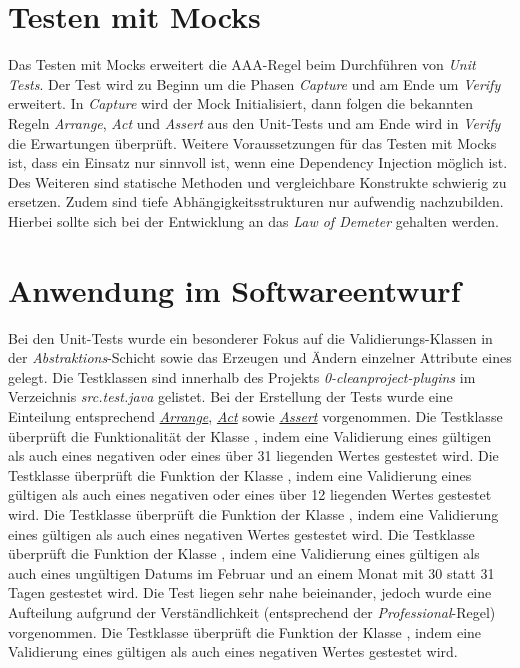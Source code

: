 \section{Testen mit Mocks}
Das Testen mit Mocks erweitert die AAA-Regel beim Durchführen von \textit{Unit Tests}.
Der Test wird zu Beginn um die Phasen \textit{Capture} und am Ende um \textit{Verify} erweitert.
In \textit{Capture} wird der Mock Initialisiert, dann folgen die bekannten Regeln \textit{Arrange}, \textit{Act} und \textit{Assert} aus den Unit-Tests und am Ende wird in \textit{Verify} die Erwartungen überprüft.
Weitere Voraussetzungen für das Testen mit Mocks ist, dass ein Einsatz nur sinnvoll ist, wenn eine Dependency Injection möglich ist.
Des Weiteren sind statische Methoden und vergleichbare Konstrukte schwierig zu ersetzen.
Zudem sind tiefe Abhängigkeitsstrukturen nur aufwendig nachzubilden.
Hierbei sollte sich bei der Entwicklung an das \textit{Law of Demeter} gehalten werden.

\section{Anwendung im Softwareentwurf}
Bei den Unit-Tests wurde ein besonderer Fokus auf die Validierungs-Klassen in der \textit{Abstraktions}-Schicht sowie das Erzeugen und Ändern einzelner Attribute eines \href{}{\code{}} gelegt.
Die Testklassen sind innerhalb des Projekts \textit{0-cleanproject-plugins} im Verzeichnis \textit{src.test.java} gelistet.
Bei der Erstellung der Tests wurde eine Einteilung entsprechend \href{}{\textit{Arrange}}, \href{}{\textit{Act}} sowie \href{}{\textit{Assert}} vorgenommen.
Die Testklasse \href{}{\code{}} überprüft die Funktionalität der Klasse \href{}{\code{}}, indem eine Validierung eines gültigen als auch eines negativen oder eines über 31 liegenden Wertes gestestet wird.
Die Testklasse \href{}{\code{}} überprüft die Funktion der Klasse \href{}{\code{}}, indem eine Validierung eines gültigen als auch eines negativen oder eines über 12 liegenden Wertes gestestet wird.
Die Testklasse \href{}{\code{}} überprüft die Funktion der Klasse \href{}{\code{}}, indem eine Validierung eines gültigen als auch eines negativen Wertes gestestet wird.
Die Testklasse \href{}{\code{}} überprüft die Funktion der Klasse , indem eine Validierung eines gültigen als auch eines ungültigen Datums im Februar und an einem Monat mit 30 statt 31 Tagen gestestet wird.
Die Test liegen sehr nahe beieinander, jedoch wurde eine Aufteilung aufgrund der Verständlichkeit (entsprechend der \textit{Professional}-Regel) vorgenommen.
Die Testklasse \href{}{\code{}} überprüft die Funktion der Klasse \href{}{\code{}}, indem eine Validierung eines gültigen als auch eines negativen Wertes gestestet wird.

